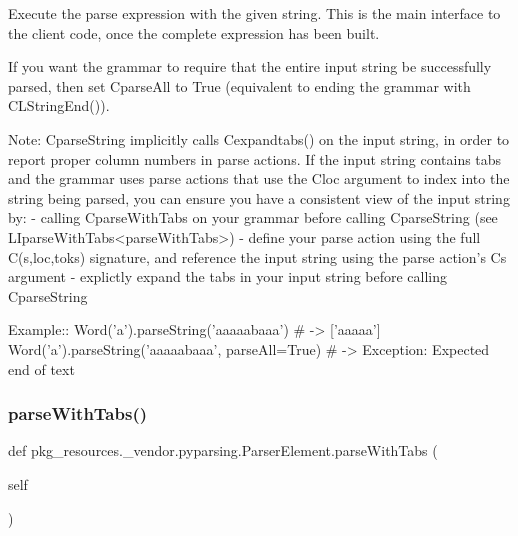 \begin{DoxyVerb}Execute the parse expression with the given string.
This is the main interface to the client code, once the complete
expression has been built.

If you want the grammar to require that the entire input string be
successfully parsed, then set C{parseAll} to True (equivalent to ending
the grammar with C{L{StringEnd()}}).

Note: C{parseString} implicitly calls C{expandtabs()} on the input string,
in order to report proper column numbers in parse actions.
If the input string contains tabs and
the grammar uses parse actions that use the C{loc} argument to index into the
string being parsed, you can ensure you have a consistent view of the input
string by:
 - calling C{parseWithTabs} on your grammar before calling C{parseString}
   (see L{I{parseWithTabs}<parseWithTabs>})
 - define your parse action using the full C{(s,loc,toks)} signature, and
   reference the input string using the parse action's C{s} argument
 - explictly expand the tabs in your input string before calling
   C{parseString}

Example::
    Word('a').parseString('aaaaabaaa')  # -> ['aaaaa']
    Word('a').parseString('aaaaabaaa', parseAll=True)  # -> Exception: Expected end of text
\end{DoxyVerb}
 \mbox{\label{classpkg__resources_1_1__vendor_1_1pyparsing_1_1_parser_element_a7216c068aabd74018dc9d34c07099d71}} 
\subsubsection{\texorpdfstring{parse\+With\+Tabs()}{parseWithTabs()}}
{\footnotesize\ttfamily def pkg\+\_\+resources.\+\_\+vendor.\+pyparsing.\+Parser\+Element.\+parse\+With\+Tabs (\begin{DoxyParamCaption}\item[{}]{self }\end{DoxyParamCaption})}

